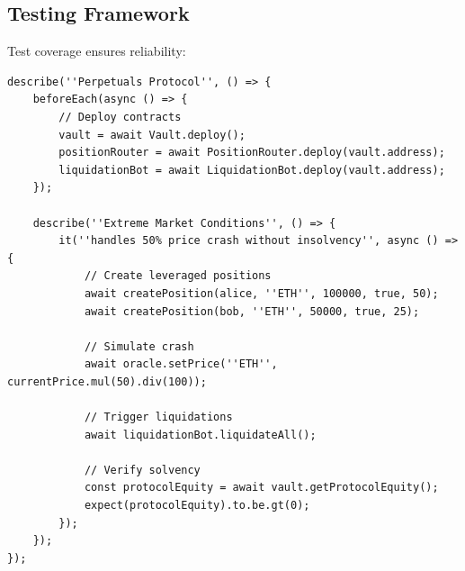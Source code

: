 \subsection{Testing Framework}

Test coverage ensures reliability:

\begin{lstlisting}[language=Solidity, caption={Integration Test Suite}]
describe(''Perpetuals Protocol'', () => {
    beforeEach(async () => {
        // Deploy contracts
        vault = await Vault.deploy();
        positionRouter = await PositionRouter.deploy(vault.address);
        liquidationBot = await LiquidationBot.deploy(vault.address);
    });

    describe(''Extreme Market Conditions'', () => {
        it(''handles 50% price crash without insolvency'', async () => {
            // Create leveraged positions
            await createPosition(alice, ''ETH'', 100000, true, 50);
            await createPosition(bob, ''ETH'', 50000, true, 25);

            // Simulate crash
            await oracle.setPrice(''ETH'', currentPrice.mul(50).div(100));

            // Trigger liquidations
            await liquidationBot.liquidateAll();

            // Verify solvency
            const protocolEquity = await vault.getProtocolEquity();
            expect(protocolEquity).to.be.gt(0);
        });
    });
});
\end{lstlisting}

